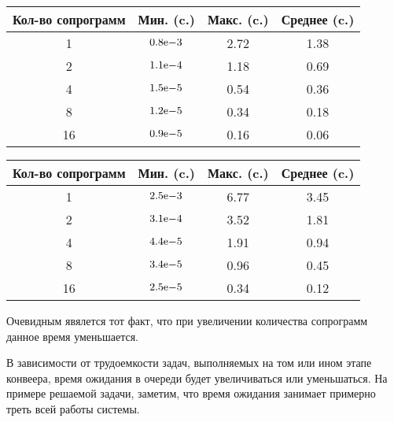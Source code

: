 \begin{table}[!ht]
	\begin{center}
		\begin{tabular}{|c|c|c|c|} 
			\hline
			Кол-во сопрограмм & Мин. (c.) & Макс. (c.) & Среднее (c.)  \\  
			\hline
			1 & ${0.8}\mathrm{e}{-3}$ & 2.72 & 1.38 \\
			\hline
			2 & ${1.1}\mathrm{e}{-4}$ & 1.18 & 0.69 \\
			\hline
			4 & ${1.5}\mathrm{e}{-5}$ & 0.54 & 0.36 \\
			\hline
			8 & ${1.2}\mathrm{e}{-5}$ & 0.34 & 0.18 \\
			\hline
			16 & ${0.9}\mathrm{e}{-5}$ & 0.16 & 0.06 \\
			\hline
		\end{tabular}
		\label{tab:profiling-queue}
	\end{center}
\end{table}


\begin{table}[!ht]
	\begin{center}
		\begin{tabular}{|c|c|c|c|} 
			\hline
			Кол-во сопрограмм & Мин. (c.) & Макс. (c.) & Среднее (c.)  \\  
			\hline
			1 & ${2.5}\mathrm{e}{-3}$ & 6.77 & 3.45 \\
			\hline
			2 & ${3.1}\mathrm{e}{-4}$ & 3.52 & 1.81 \\
			\hline
			4 & ${4.4}\mathrm{e}{-5}$ & 1.91 & 0.94 \\
			\hline
			8 & ${3.4}\mathrm{e}{-5}$ & 0.96 & 0.45 \\
			\hline
			16 & ${2.5}\mathrm{e}{-5}$ & 0.34 & 0.12 \\
			\hline
		\end{tabular}
		\label{tab:profiling-all}
	\end{center}
\end{table}

Очевидным явялется тот факт, что при увеличении количества сопрограмм данное время уменьшается.

В зависимости от трудоемкости задач, выполняемых на том или ином этапе конвеера, время ожидания в очереди будет
увеличиваться или уменьшаться. На примере решаемой задачи, заметим, что время ожидания занимает примерно треть всей работы
системы.


